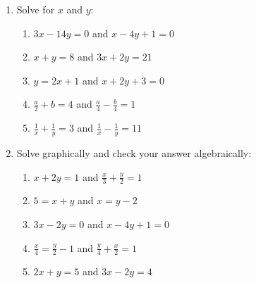 \begin{exercises}{}
{

\begin{enumerate}[noitemsep, label=\textbf{\arabic*}. ] 
\item Solve for $x$ and $y$: 
\begin{enumerate}[noitemsep, label=\textbf{(\alph*)} ] 
\item $3x-14y=0$ and $x-4y+1=0$
\item $x+y=8$ and $3x + 2y = 21$
\item $y=2x+1$ and $x + 2y + 3 = 0$
\item $\frac{a}{2}+b=4$ and $\frac{a}{4} -\frac{b}{4}=1$
\item $\frac{1}{x}+\frac{1}{y}=3$ and $\frac{1}{x}-\frac{1}{y}=11$
\end{enumerate}
\item Solve graphically and check your answer algebraically:
\begin{enumerate}[noitemsep, label=\textbf{(\alph*)} ] 
\item  $x+2y=1$ and $\frac{x}{3} + \frac{y}{2} = 1$
\item $5= x+y$ and $x = y-2$
\item $3x - 2y = 0$ and $x - 4y + 1 = 0$
\item $\frac{x}{4}=\frac{y}{2}-1$  and $\frac{y}{4}+\frac{x}{2}=1$
\item $2x+y=5$ and $3x-2y=4$
\end{enumerate}
\end{enumerate}

}
\end{exercises}


